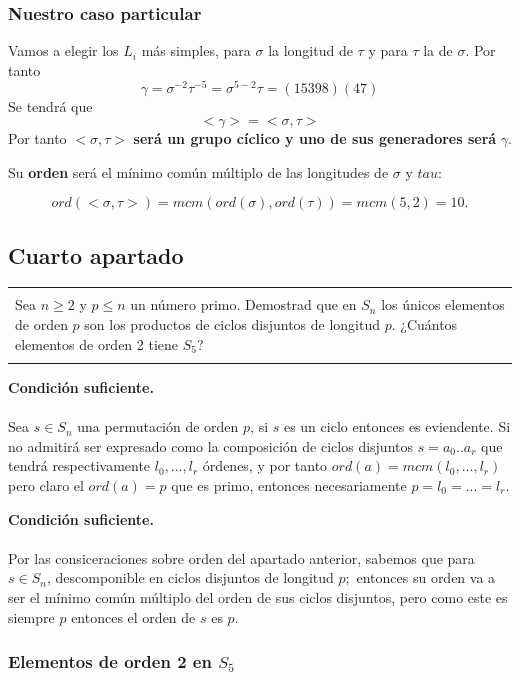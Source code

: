 \documentclass[12pt]{article}
\newenvironment{micaja}
{
    \begin{center}
    \begin{tabular}{|p{0.9\textwidth}|}
    \hline\\
    }   
    {   
    \\\\\hline
    \end{tabular} 
    \end{center}
    }
\begin{document}
\subsubsection*{Nuestro caso particular}
Vamos a elegir los $L_i$ más simples, para $\sigma$ la longitud de $\tau$ y para 
$\tau$ la de $\sigma.$ 
Por tanto 
 $$\gamma = \sigma ^{-2} \tau ^{-5} = \sigma^{5-2}\tau  = (1 5 3 9 8)(4 7)$$ 
 Se tendrá que 
 $$<\gamma> = < \sigma, \tau>$$ Por tanto $< \sigma, \tau>$ \textbf{ será un grupo cíclico 
 y uno de sus generadores será} $\gamma.$
 
 Su \textbf{orden} será el mínimo común múltiplo de las longitudes de $\sigma$ y $tau$: 

 $$ord(< \sigma, \tau>) = mcm(ord(\sigma), ord(\tau)) = mcm (5,2) = 10.$$

\subsection{Cuarto apartado}

\begin{micaja}
    Sea $n \geq 2$ y $p \leq n$ un número primo. Demostrad que en $S_n$ los únicos elementos
    de orden $p$ son los productos de ciclos disjuntos de longitud $p.$ ¿Cuántos elementos de orden
    2 tiene $S_5$?
\end{micaja}


\textbf{Condición suficiente.}\paragraph{}
 Sea $s \in S_n$  una permutación de orden $p$, si $s$ es un ciclo entonces es eviendente. 
 Si no admitirá ser expresado como la composición de ciclos disjuntos $s = a_0..a_r$ que 
 tendrá respectivamente $l_0, ..., l_r$ órdenes, y por tanto $ord(a) = mcm(l_0,...,l_r)$
 pero claro el $ord(a) = p$ que es primo, entonces necesariamente $p = l_0 = ... = l_r.$ 


\textbf{Condición suficiente.}\paragraph{}
Por las consiceraciones sobre orden del apartado anterior, sabemos que para $s \in S_n$, 
descomponible en ciclos disjuntos de longitud $p;$ entonces su orden 
va a ser el mínimo común múltiplo del orden de sus ciclos disjuntos, pero como este es
siempre $p$ entonces el orden de $s$ es $p.$

\subsubsection*{Elementos de orden 2 en $S_5$}
\end{document}
